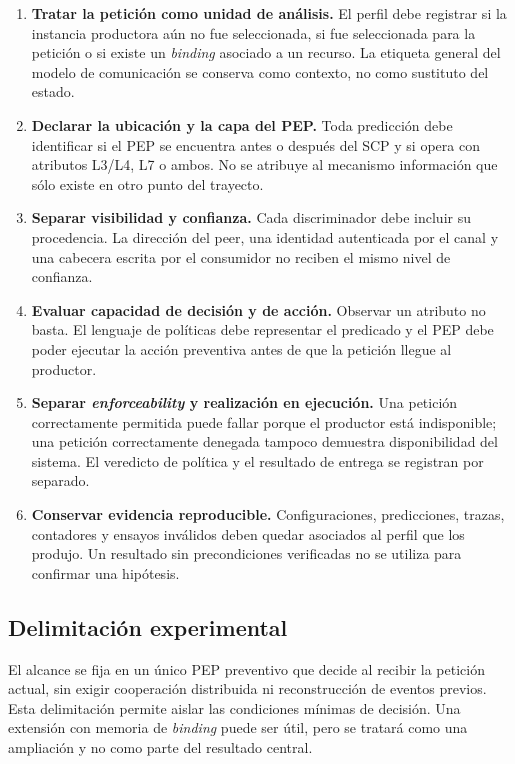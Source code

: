 \begin{enumerate}
    \item \textbf{Tratar la petición como unidad de análisis.} El perfil debe registrar si la instancia productora aún no fue seleccionada, si fue seleccionada para la petición o si existe un \textit{binding} asociado a un recurso. La etiqueta general del modelo de comunicación se conserva como contexto, no como sustituto del estado.

    \item \textbf{Declarar la ubicación y la capa del PEP.} Toda predicción debe identificar si el PEP se encuentra antes o después del SCP y si opera con atributos L3/L4, L7 o ambos. No se atribuye al mecanismo información que sólo existe en otro punto del trayecto.

    \item \textbf{Separar visibilidad y confianza.} Cada discriminador debe incluir su procedencia. La dirección del peer, una identidad autenticada por el canal y una cabecera escrita por el consumidor no reciben el mismo nivel de confianza.

    \item \textbf{Evaluar capacidad de decisión y de acción.} Observar un atributo no basta. El lenguaje de políticas debe representar el predicado y el PEP debe poder ejecutar la acción preventiva antes de que la petición llegue al productor.

    \item \textbf{Separar \textit{enforceability} y realización en ejecución.} Una petición correctamente permitida puede fallar porque el productor está indisponible; una petición correctamente denegada tampoco demuestra disponibilidad del sistema. El veredicto de política y el resultado de entrega se registran por separado.

    \item \textbf{Conservar evidencia reproducible.} Configuraciones, predicciones, trazas, contadores y ensayos inválidos deben quedar asociados al perfil que los produjo. Un resultado sin precondiciones verificadas no se utiliza para confirmar una hipótesis.
\end{enumerate}

\subsection{Delimitación experimental}
\label{subsec:decisiones-arquitectonicas}

El alcance se fija en un único PEP preventivo que decide al recibir la petición actual, sin exigir cooperación distribuida ni reconstrucción de eventos previos. Esta delimitación permite aislar las condiciones mínimas de decisión. Una extensión con memoria de \textit{binding} puede ser útil, pero se tratará como una ampliación y no como parte del resultado central.

